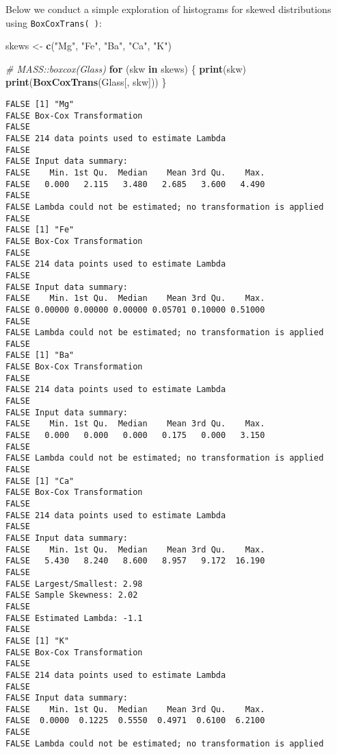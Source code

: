 \documentclass[openany]{book}
\newenvironment{Shaded}{\begin{snugshade}}{\end{snugshade}}
\newcommand{\CommentTok}[1]{\textcolor[rgb]{0.56,0.35,0.01}{\textit{#1}}}
\newcommand{\ControlFlowTok}[1]{\textcolor[rgb]{0.13,0.29,0.53}{\textbf{#1}}}
\newcommand{\KeywordTok}[1]{\textcolor[rgb]{0.13,0.29,0.53}{\textbf{#1}}}
\newcommand{\NormalTok}[1]{#1}
\newcommand{\StringTok}[1]{\textcolor[rgb]{0.31,0.60,0.02}{#1}}
\begin{document}
Below we conduct a simple exploration of histograms for skewed distributions using \texttt{BoxCoxTrans(\ )}:

\begin{Shaded}
\begin{Highlighting}[]
\NormalTok{skews <-}\StringTok{ }\KeywordTok{c}\NormalTok{(}\StringTok{"Mg"}\NormalTok{, }\StringTok{"Fe"}\NormalTok{, }\StringTok{"Ba"}\NormalTok{, }\StringTok{"Ca"}\NormalTok{, }\StringTok{"K"}\NormalTok{)}

\CommentTok{# MASS::boxcox(Glass)}
\ControlFlowTok{for}\NormalTok{ (skw }\ControlFlowTok{in}\NormalTok{ skews) \{}
  \KeywordTok{print}\NormalTok{(skw)}
  \KeywordTok{print}\NormalTok{(}\KeywordTok{BoxCoxTrans}\NormalTok{(Glass[, skw]))}
\NormalTok{\}}
\end{Highlighting}
\end{Shaded}

\begin{verbatim}
FALSE [1] "Mg"
FALSE Box-Cox Transformation
FALSE 
FALSE 214 data points used to estimate Lambda
FALSE 
FALSE Input data summary:
FALSE    Min. 1st Qu.  Median    Mean 3rd Qu.    Max. 
FALSE   0.000   2.115   3.480   2.685   3.600   4.490 
FALSE 
FALSE Lambda could not be estimated; no transformation is applied
FALSE 
FALSE [1] "Fe"
FALSE Box-Cox Transformation
FALSE 
FALSE 214 data points used to estimate Lambda
FALSE 
FALSE Input data summary:
FALSE    Min. 1st Qu.  Median    Mean 3rd Qu.    Max. 
FALSE 0.00000 0.00000 0.00000 0.05701 0.10000 0.51000 
FALSE 
FALSE Lambda could not be estimated; no transformation is applied
FALSE 
FALSE [1] "Ba"
FALSE Box-Cox Transformation
FALSE 
FALSE 214 data points used to estimate Lambda
FALSE 
FALSE Input data summary:
FALSE    Min. 1st Qu.  Median    Mean 3rd Qu.    Max. 
FALSE   0.000   0.000   0.000   0.175   0.000   3.150 
FALSE 
FALSE Lambda could not be estimated; no transformation is applied
FALSE 
FALSE [1] "Ca"
FALSE Box-Cox Transformation
FALSE 
FALSE 214 data points used to estimate Lambda
FALSE 
FALSE Input data summary:
FALSE    Min. 1st Qu.  Median    Mean 3rd Qu.    Max. 
FALSE   5.430   8.240   8.600   8.957   9.172  16.190 
FALSE 
FALSE Largest/Smallest: 2.98 
FALSE Sample Skewness: 2.02 
FALSE 
FALSE Estimated Lambda: -1.1 
FALSE 
FALSE [1] "K"
FALSE Box-Cox Transformation
FALSE 
FALSE 214 data points used to estimate Lambda
FALSE 
FALSE Input data summary:
FALSE    Min. 1st Qu.  Median    Mean 3rd Qu.    Max. 
FALSE  0.0000  0.1225  0.5550  0.4971  0.6100  6.2100 
FALSE 
FALSE Lambda could not be estimated; no transformation is applied
\end{verbatim}
\end{document}
